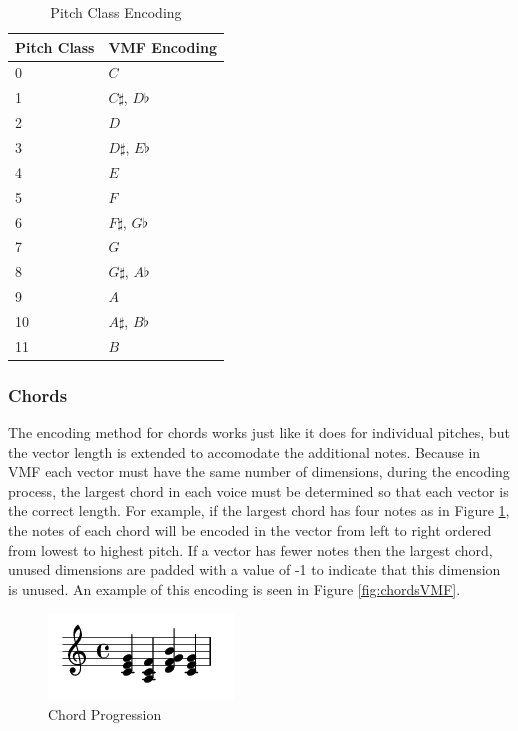 \begin{table}[ht]
  \centering
  \begin{tabular}{ll}
  Pitch Class & VMF Encoding \\ \hline
  0           & $C$            \\
  1           & $C\sharp$, $D\flat$      \\
  2           & $D$            \\
  3           & $D\sharp$, $E\flat$      \\
  4           & $E$            \\
  5           & $F$            \\
  6           & $F\sharp$, $G\flat$      \\
  7           & $G$            \\
  8           & $G\sharp$, $A\flat$      \\
  9           & $A$            \\
  10          & $A\sharp$, $B\flat$      \\
  11          & $B$            
  \end{tabular}
  \caption{Pitch Class Encoding}
  \label{tab:pitchClassEncoding}
\end{table}

\subsubsection{Chords}

The encoding method for chords works just like it does for individual pitches, but the vector length is extended to accomodate the additional notes. Because in VMF each vector must have the same number of dimensions, during the encoding process, the largest chord in each voice must be determined so that each vector is the correct length. For example, if the largest chord has four notes as in Figure \ref{fig:chordsWestern}, the notes of each chord will be encoded in the vector from left to right ordered from lowest to highest pitch. If a vector has fewer notes then the largest chord, unused dimensions are padded with a value of -1 to indicate that this dimension is unused. An example of this encoding is seen in Figure \ref{fig:chordsVMF}.

\begin{figure}
  \begin{center}
    \includegraphics[scale=0.75]{lilypond/chords}
    \caption{Chord Progression}
    \label{fig:chordsWestern}
  \end{center}
\end{figure}

